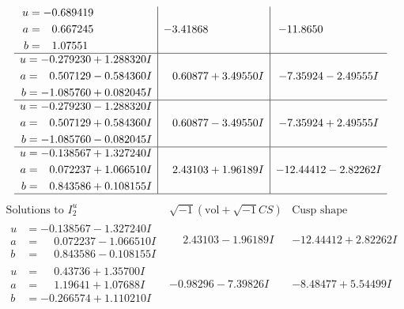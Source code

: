 \documentclass[1p]{elsarticle_modified}
\theoremstyle{definition}
\newcommand{\I}{\sqrt{-1}}
\begin{document}
$$\begin{array}{c|c|c}
\begin{aligned}
u &= -0.689419\phantom{ +0.000000I} \\
a &= \phantom{-}0.667245\phantom{ +0.000000I} \\
b &= \phantom{-}1.07551\phantom{ +0.000000I}\end{aligned}
 & -3.41868\phantom{ +0.000000I} & -11.8650\phantom{ +0.000000I} \\ \hline\begin{aligned}
u &= -0.279230 + 1.288320 I \\
a &= \phantom{-}0.507129 - 0.584360 I \\
b &= -1.085760 + 0.082045 I\end{aligned}
 & \phantom{-}0.60877 + 3.49550 I & -7.35924 - 2.49555 I \\ \hline\begin{aligned}
u &= -0.279230 - 1.288320 I \\
a &= \phantom{-}0.507129 + 0.584360 I \\
b &= -1.085760 - 0.082045 I\end{aligned}
 & \phantom{-}0.60877 - 3.49550 I & -7.35924 + 2.49555 I \\ \hline\begin{aligned}
u &= -0.138567 + 1.327240 I \\
a &= \phantom{-}0.072237 + 1.066510 I \\
b &= \phantom{-}0.843586 + 0.108155 I\end{aligned}
 & \phantom{-}2.43103 + 1.96189 I & -12.44412 - 2.82262 I\\
 \hline 
 \end{array}$$\newpage$$\begin{array}{c|c|c}  
\text{Solutions to }I^u_{2}& \I (\text{vol} + \sqrt{-1}CS) & \text{Cusp shape}\\
 \hline 
\begin{aligned}
u &= -0.138567 - 1.327240 I \\
a &= \phantom{-}0.072237 - 1.066510 I \\
b &= \phantom{-}0.843586 - 0.108155 I\end{aligned}
 & \phantom{-}2.43103 - 1.96189 I & -12.44412 + 2.82262 I \\ \hline\begin{aligned}
u &= \phantom{-}0.43736 + 1.35700 I \\
a &= \phantom{-}1.19641 + 1.07688 I \\
b &= -0.266574 + 1.110210 I\end{aligned}
 & -0.98296 - 7.39826 I & -8.48477 + 5.54499 I \\ \hline\begin{aligned}

\end{aligned}
\end{array}$$
\end{document}
